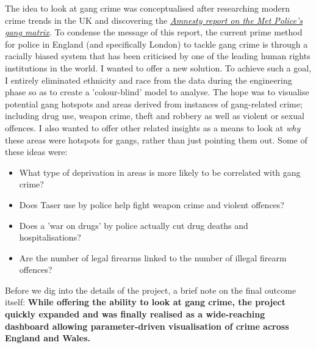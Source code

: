 \documentclass{article}
\newcommand{\sectionbox}[1]{\par\noindent\colorbox{blue-black}
{\sbox{0}{\centering\parbox{\dimexpr\textwidth+35\fboxsep\relax}{#1}}
    \ifdim\dimexpr\ht0+\dp0>0.5m 
    \dp0\dimexpr1.2cm-\ht0\fi
    \fbox{\usebox{0}}}}
\newenvironment{changemargin}[2]{%
\begin{list}{}{%
\setlength{\leftmargin}{#1}%
\setlength{\rightmargin}{#2}%
\setlength{\listparindent}{\parindent}%
\setlength{\itemindent}{\parindent}%
\setlength{\parsep}{\parskip}%
}%
\item[]}{\end{list}}
\begin{document}
\begin{changemargin}{-3em}{-5em}
\sectionbox{\textsc{\color{electro-blue} \vspace{-1em} \hspace{5em} \section{Aims of the Project} }}
\end{changemargin}
\vspace{1em}
The idea to look at gang crime was conceptualised after researching modern crime trends in the UK and discovering the \emph{\href{https://www.amnesty.org.uk/press-releases/met-police-using-racially-discriminatory-gangs-matrix-database}{Amnesty report on the Met Police's gang matrix}}. To condense the message of this report, the current prime method for police in England (and specifically London) to tackle gang crime is through a racially biased system that has been criticised by one of the leading human rights institutions in the world. 
\linebreak \linebreak
I wanted to offer a new solution.
\linebreak \linebreak
To achieve such a goal, I entirely eliminated ethnicity and race from the data during the engineering phase so as to create a 'colour-blind' model to analyse. The hope was to visualise potential gang hotspots and areas derived from instances of gang-related crime; including drug use, weapon crime, theft and robbery as well as violent or sexual offences.
\linebreak \linebreak
I also wanted to offer other related insights as a means to look at \emph{why} these areas were hotspots for gangs, rather than just pointing them out.
\linebreak
Some of these ideas were:
\vspace{1em}
\begin{itemize} %
	\item What type of deprivation in areas is more likely to be correlated with gang crime?
	\item Does Taser use by police help fight weapon crime and violent offences?
	\item Does a 'war on drugs' by police actually cut drug deaths and hospitalisations?
	\item Are the number of legal firearms linked to the number of illegal firearm offences?
\end{itemize}
\vspace{1em}
Before we dig into the details of the project, a brief note on the final outcome itself:
\linebreak \linebreak
\textbf{While offering the ability to look at gang crime, the project quickly expanded and was finally realised as a wide-reaching dashboard allowing parameter-driven visualisation of crime across England and Wales.}
\vspace{3em}
\end{document}
